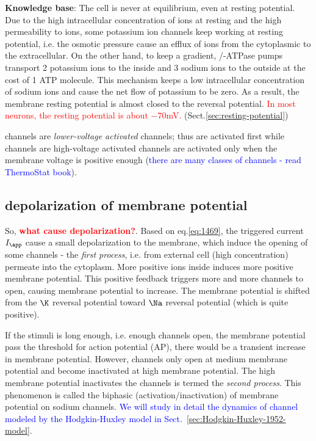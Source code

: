 \begin{mdframed} 

{\bf Knowledge base}: The cell is never at equilibrium,
even at resting potential. Due to the high intracellular
concentration of  ions at resting and the high permeability
to  ions, some potassium ion channels keep working at resting
potential, i.e. the osmotic pressure cause an efflux of  ions
from the cytoplasmic to the extracellular. On the other hand, to
keep a gradient, /-ATPase pumps transport 2 potassium
ions to the inside and 3 sodium ions to the outside at the cost of 1
ATP molecule. This mechanism keeps a low intracellular concentration
of sodium ions and cause the net flow of potassium to be zero. As a
result, the membrane resting potential is almost closed to the
 reversal potential.
\textcolor{red}{In most neurons, the resting potential is about
$-70$mV.} (Sect.\ref{sec:resting-potential})

 channels are {\it lower-voltage activated} channels; thus
are activated first while  channels are high-voltage
activated channels are activated only when the membrane voltage is
positive enough
(\textcolor{blue}{there are many classes of  channels - read
ThermoStat book}).

\end{mdframed} 


\subsection{ depolarization of membrane potential}

So, \textcolor{red}{\bf what cause depolarization?}. Based on eq.\ref{eq:1469},
the triggered current $I_\app$ cause a small depolarization to the membrane,
which induce the opening of some  channels - the {\it first process},
i.e.
 from external cell (high concentration) permeate into the cytoplasm.
More positive ions inside induces more positive membrane potential. This
positive feedback triggers more and more  channels to open, causing
membrane potential to increase. The membrane potential is shifted from the $\K$
reversal potential toward $\Na$ reversal potential (which is quite positive).

If the stimuli is long enough, i.e. enough  channels open, the membrane
potential pass the threshold for action potential (AP), there would be a
transient increase in membrane potential.
However,  channels only open at medium membrane potential and become
inactivated at high membrane potential. The high membrane potential inactivates
the  channels is termed the {\it second process}. This phenomenon is
called the biphasic (activation/inactivation) of membrane potential on sodium
channels. \textcolor{blue}{We will study in detail the dynamics of 
channel modeled by the Hodgkin-Huxley model in
Sect.~\ref{sec:Hodgkin-Huxley-1952-model}}.


